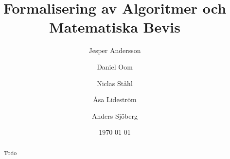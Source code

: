 \documentclass[a4paper]{article}
\title{Formalisering av Algoritmer och Matematiska Bevis}
\author[1]{Jesper Andersson}
\author[1]{Daniel Oom}
\author[1]{Niclas Ståhl}
\author[2]{Åsa Lideström}
\author[2]{Anders Sjöberg}
\affil[1]{Datateknik, Chalmers}
\affil[2]{Mattematik, Göteborgs Universitet}
\date{\today}
\begin{document}
\begin{abstract}
Todo
\end{abstract}

\maketitle
\thispagestyle{empty}
\newpage
\tableofcontents
\newpage





\printbibliography

\appendix



\end{document}
